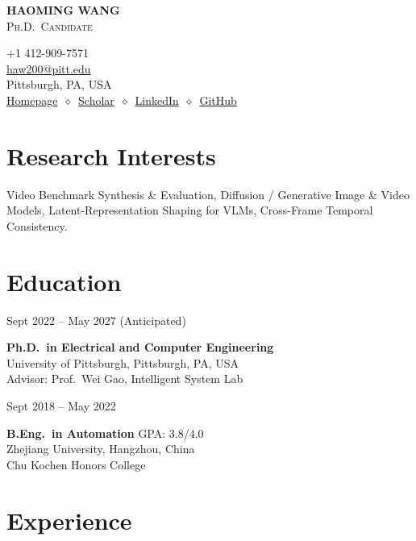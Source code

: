 \documentclass[11pt, letterpaper]{article}
\newenvironment{datedentry}[1]{%
  \par\noindent
  \begin{minipage}[t]{2.8cm}\raggedright\small #1\end{minipage}%
  \hspace{0.3cm}%
  \begin{minipage}[t]{\dimexpr\linewidth-3.1cm\relax}\raggedright
}{\end{minipage}\par\medskip}
\begin{document}
\noindent
\begin{minipage}[t]{0.58\linewidth}
  \vspace{0pt}
  {\fontsize{24pt}{26pt}\selectfont \textbf{HAOMING WANG}}\\[2pt]
  {\scshape\normalsize Ph.D.\ Candidate}
\end{minipage}%
\begin{minipage}[t]{0.42\linewidth}
  \vspace{0pt}
  \raggedleft\small
  +1 412-909-7571 \\
  \href{mailto:haw200@pitt.edu}{haw200@pitt.edu} \\
  Pittsburgh, PA, USA \\[2pt]
  \href{https://haomingwang645.github.io/}{Homepage}\ $\diamond$\ \href{https://scholar.google.com.hk/citations?user=bf6LCjUAAAAJ}{Scholar}\ $\diamond$\ \href{https://www.linkedin.com/in/haoming-wang-40a6a7239/}{LinkedIn}\ $\diamond$\ \href{https://github.com/HaomingWang645}{GitHub}
\end{minipage}

\section{Research Interests}
Video Benchmark Synthesis \& Evaluation, Diffusion / Generative Image \& Video Models, Latent-Representation Shaping for VLMs, Cross-Frame Temporal Consistency.

\section{Education}

\begin{datedentry}{Sept 2022 -- May 2027 (Anticipated)}
\textbf{Ph.D.\ in Electrical and Computer Engineering}\\
University of Pittsburgh, Pittsburgh, PA, USA\\
Advisor: Prof.\ Wei Gao, Intelligent System Lab
\end{datedentry}

\begin{datedentry}{Sept 2018 -- May 2022}
\textbf{B.Eng.\ in Automation} \hfill GPA: 3.8/4.0\\
Zhejiang University, Hangzhou, China\\
Chu Kochen Honors College
\end{datedentry}

\section{Experience}
\end{document}
